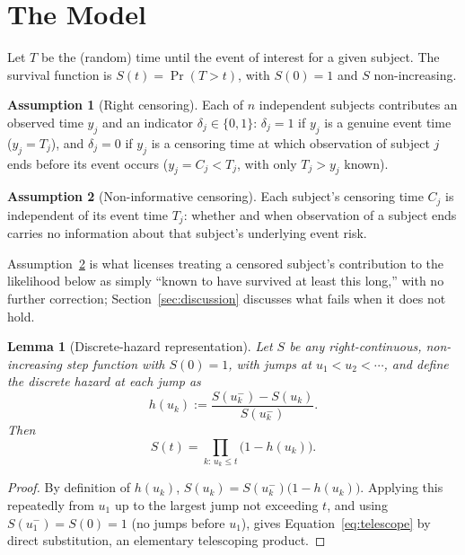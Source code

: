 \documentclass[11pt]{article}
\newtheorem{lemma}{Lemma}
\theoremstyle{remark}
\theoremstyle{definition}
\newtheorem{assumption}{Assumption}
\begin{document}
\section{The Model}
\label{sec:model}

Let $T$ be the (random) time until the event of interest for a given subject. The survival function is $S(t)=\Pr(T>t)$, with $S(0)=1$ and $S$ non-increasing.

\begin{assumption}[Right censoring]
\label{ass:censoring}
Each of $n$ independent subjects contributes an observed time $y_j$ and an indicator $\delta_j\in\{0,1\}$: $\delta_j=1$ if $y_j$ is a genuine event time ($y_j=T_j$), and $\delta_j=0$ if $y_j$ is a censoring time at which observation of subject $j$ ends before its event occurs ($y_j=C_j<T_j$, with only $T_j>y_j$ known).
\end{assumption}

\begin{assumption}[Non-informative censoring]
\label{ass:noninformative}
Each subject's censoring time $C_j$ is independent of its event time $T_j$: whether and when observation of a subject ends carries no information about that subject's underlying event risk.
\end{assumption}

Assumption~\ref{ass:noninformative} is what licenses treating a censored subject's contribution to the likelihood below as simply ``known to have survived at least this long,'' with no further correction; Section~\ref{sec:discussion} discusses what fails when it does not hold.

\begin{lemma}[Discrete-hazard representation]
\label{lem:telescope}
Let $S$ be any right-continuous, non-increasing step function with $S(0)=1$, with jumps at $u_1<u_2<\cdots$, and define the discrete hazard at each jump as
\begin{equation*}
h(u_k) := \frac{S(u_k^{-})-S(u_k)}{S(u_k^{-})}.
\end{equation*}
Then
\begin{equation}
S(t) = \prod_{k:\,u_k\le t}\big(1-h(u_k)\big).
\label{eq:telescope}
\end{equation}
\end{lemma}
\begin{proof}
By definition of $h(u_k)$, $S(u_k) = S(u_k^{-})\big(1-h(u_k)\big)$. Applying this repeatedly from $u_1$ up to the largest jump not exceeding $t$, and using $S(u_1^-)=S(0)=1$ (no jumps before $u_1$), gives Equation~\eqref{eq:telescope} by direct substitution, an elementary telescoping product.
\end{proof}
\end{document}
